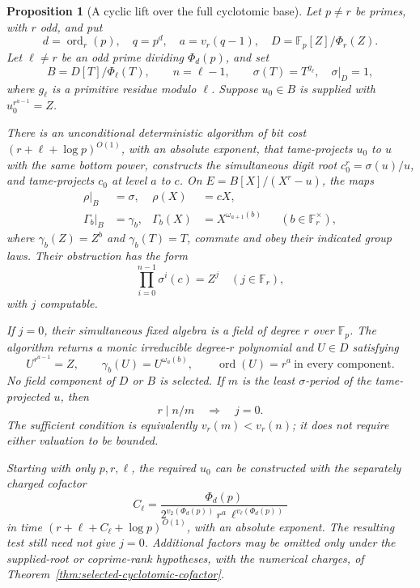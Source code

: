 \documentclass[11pt]{article}
\newtheorem{proposition}[theorem]{Proposition}
\theoremstyle{definition}
\theoremstyle{remark}
\begin{document}
\begin{proposition}[A cyclic lift over the full cyclotomic base]
\label{prop:full-cyclotomic-lift}
Let \(p\ne r\) be primes, with \(r\) odd, and put
\[
 d=\operatorname{ord}_r(p),\quad q=p^d,\quad a=v_r(q-1),
 \quad D=\mathbb F_p[Z]/\Phi_r(Z).
\]
Let \(\ell\ne r\) be an odd prime dividing \(\Phi_d(p)\), and set
\[
 B=D[T]/\Phi_\ell(T),\qquad n=\ell-1,\qquad
 \sigma(T)=T^{g_\ell},\quad \sigma|_D=1,
\]
where \(g_\ell\) is a primitive residue modulo \(\ell\).
Suppose \(u_0\in B\) is supplied with \(u_0^{r^{a-1}}=Z\).

There is an unconditional deterministic algorithm of bit cost
\((r+\ell+\log p)^{O(1)}\), with an absolute exponent, that
tame-projects \(u_0\) to \(u\) with the same bottom power, constructs
the simultaneous digit root \(c_0^r=\sigma(u)/u\), and
tame-projects \(c_0\) at level \(a\) to \(c\).
On \(E=B[X]/(X^r-u)\), the maps
\[
 \begin{aligned}
 \rho|_B&=\sigma,& \rho(X)&=cX,\\
 \Gamma_b|_B&=\gamma_b,&
 \Gamma_b(X)&=X^{\omega_{a+1}(b)}
                 &&(b\in\mathbb F_r^\times),
 \end{aligned}
\]
where \(\gamma_b(Z)=Z^b\) and \(\gamma_b(T)=T\), commute and
obey their indicated group laws.  Their obstruction has the form
\[
                       \prod_{i=0}^{n-1}\sigma^i(c)=Z^j
                         \quad(j\in\mathbb F_r),
\]
with \(j\) computable.

If \(j=0\), their simultaneous fixed algebra is a field of degree
\(r\) over \(\mathbb F_p\).  The algorithm returns a monic
irreducible degree-\(r\) polynomial and \(U\in D\) satisfying
\[
 U^{r^{a-1}}=Z,\qquad
 \gamma_b(U)=U^{\omega_a(b)},\qquad
 \operatorname{ord}(U)=r^a\ \text{in every component}.
\]
No field component of \(D\) or \(B\) is selected.
If \(m\) is the least \(\sigma\)-period of the tame-projected \(u\),
then
\[
                    r\mid n/m
             \quad\Longrightarrow\quad j=0.
\]
The sufficient condition is equivalently
\(v_r(m)<v_r(n)\); it does not require either valuation to be bounded.

Starting with only \(p,r,\ell\), the required \(u_0\) can be
constructed with the separately charged cofactor
\[
 C_\ell=
 \frac{\Phi_d(p)}
 {2^{v_2(\Phi_d(p))}\,r^a\,\ell^{v_\ell(\Phi_d(p))}}
\]
in time \((r+\ell+C_\ell+\log p)^{O(1)}\), with an absolute
exponent.  The resulting test still need not give \(j=0\).
Additional factors may be omitted only under the supplied-root or
coprime-rank hypotheses, with the numerical charges, of
Theorem~\ref{thm:selected-cyclotomic-cofactor}.
\end{proposition}
\end{document}
